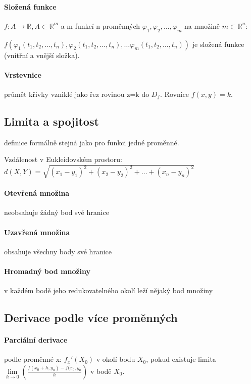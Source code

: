 \documentclass[a4paper, 11pt]{report}
\begin{document}
\paragraph{Složená funkce} $f:A \to \mathbb{R}, A \subset \mathbb{R}^m$ a m funkcí n proměnných $\varphi_1, \varphi_2, \dots, \varphi_m$ na množině $m \subset \mathbb{R}^n$:

$f( \varphi_1(t_1, t_2, \dots, t_n),  \varphi_2(t_1, t_2, \dots, t_n), \dots \varphi_m(t_1, t_2, \dots, t_n) )$ je složená funkce (vnitřní a vnější složka).

\paragraph{Vrstevnice} průmět křivky vzniklé jako řez rovinou z=k do $D_f$. Rovnice $f(x,y) = k$.

\subsection{Limita a spojitost}

definice formálně stejná jako pro funkci jedné proměnné.

Vzdálenost v Eukleidovském prostoru: $d(X,Y) = \sqrt{(x_1 - y_1)^2 + (x_2 - y_2)^2 + \dots + (x_n - y_n)^2}$

\paragraph{Otevřená množina} neobsahuje žádný bod své hranice
\paragraph{Uzavřená množina} obsahuje všechny body své hranice
\paragraph{Hromadný bod množiny} v každém bodě jeho redukovatelného okolí leží nějaký bod množiny

\subsection{Derivace podle více proměnných}

\paragraph{Parciální derivace} podle proměnné x: $f_x'(X_0)$ v okolí bodu $X_0$, pokud existuje limita $\lim\limits_{h \to 0} \left( \frac{f(x_0 +h, y_0) - f(x_0, y_0}{h} \right)$ v bodě $X_0$.
\end{document}
